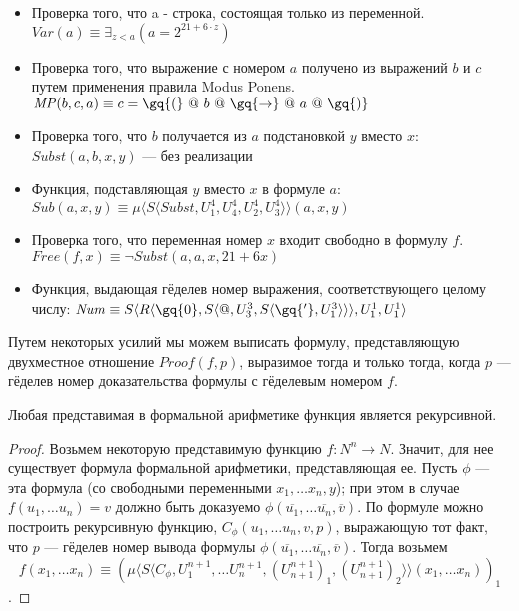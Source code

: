 \begin{itemize}
\item Проверка того, что a - строка, состоящая только из переменной.
$\mathit{Var}(a) \equiv \exists_{z < a} (a = 2 ^ {21 + 6\cdot z})$

\item Проверка того, что выражение с номером $a$ получено из выражений $b$ и $c$ 
путем применения правила Modus Ponens.
$\mathit{MP} (b,c,a) \equiv c = \gq{(} ~@~ b ~@~ \gq{\rightarrow} ~@~ a ~@~ \gq{)}$

\item Проверка того, что $b$ получается из $a$ подстановкой $y$ вместо $x$:
$\mathit{Subst} (a,b,x,y)$ --- без реализации

\item Функция, подставляющая $y$ вместо $x$ в формуле $a$:\\
$\mathit{Sub} (a,x,y) \equiv \mu \langle{}S\langle{}\mathit{Subst},U^4_1,U^4_4,U^4_2,U^4_3\rangle\rangle(a,x,y)$

\item Проверка того, что переменная номер $x$ входит свободно в формулу $f$.\\
$\mathit{Free} (f,x) \equiv \neg \mathit{Subst}(a,a,x,21 + 6x)$

\item Функция, выдающая гёделев номер выражения, соответствующего целому числу:
$\mathit{Num} \equiv S\langle{}R\langle{}\gq{0},S\langle{}@,U^3_3,S\langle{}\gq{'},U^3_1\rangle{}\rangle{}\rangle,U^1_1,U^1_1\rangle{}$

\end{itemize}

Путем некоторых усилий мы можем выписать формулу, представляющую
двухместное отношение $\mathit{Proof}(f,p)$, выразимое тогда и только тогда, когда
$p$ --- гёделев номер доказательства формулы с гёделевым номером $f$.

\begin{theorem}
Любая представимая в формальной арифметике функция является рекурсивной.
\end{theorem}
\begin{proof}
Возьмем некоторую представимую функцию $f: N^n \rightarrow N$. Значит, для нее существует
формула формальной арифметики, представляющая ее. Пусть $\phi$ --- эта формула
(со свободными переменными $x_1, \dots x_n, y$); при этом в случае 
$f(u_1, \dots u_n) = v$ должно быть доказуемо $\phi(\overline{u_1}, \dots \overline{u_n}, \overline{v})$.
По формуле можно построить рекурсивную функцию, $C_\phi (u_1, \dots u_n, v, p)$, 
выражающую тот факт, что $p$ --- гёделев номер вывода формулы 
$\phi(\overline{u_1}, \dots \overline{u_n}, \overline{v})$. Тогда 
возьмем $$f (x_1, \dots x_n) \equiv (\mu \langle{}S\langle{}C_\phi,U^{n+1}_1,\dots U^{n+1}_n,(U^{n+1}_{n+1})_1, (U^{n+1}_{n+1})_2\rangle\rangle (x_1, \dots x_n))_1$$.
\end{proof}
